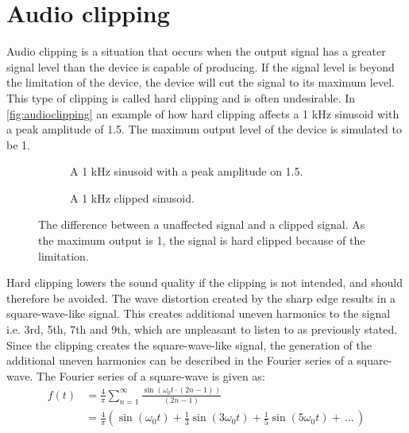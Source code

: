 \section{Audio clipping}

Audio clipping is a situation that occurs when the output signal has a greater signal level than the device is capable of producing. If the signal level is beyond the limitation of the device, the device will cut the signal to its maximum level. This type of clipping is called hard clipping and is often undesirable. In \autoref{fig:audioclipping} an example of how hard clipping affects a 1 kHz sinusoid with a peak amplitude of 1.5. The maximum output level of the device is simulated to be 1.

\begin{figure}[H]
\centering
\begin{subfigure}[t]{0.47\textwidth}
	
	\caption{A 1 kHz sinusoid with a peak amplitude on 1.5.}
	\label{fig:clippingClean}
\end{subfigure}
\hspace{6mm} 
\begin{subfigure}[t]{0.47\textwidth}
	
	\caption{A 1 kHz clipped sinusoid.}
	\label{fig:clippingDist}
\end{subfigure}
\caption{The difference between a unaffected signal and a clipped signal. As the maximum output is 1, the signal is hard clipped because of the limitation.}
\label{fig:audioclipping}
\end{figure}

Hard clipping lowers the sound quality if the clipping is not intended, and should therefore be avoided. The wave distortion created by the sharp edge results in a square-wave-like signal. This creates additional uneven harmonics to the signal i.e. 3rd, 5th, 7th and 9th, which are unpleasant to listen to as previously stated. Since the clipping creates the square-wave-like signal, the generation of the additional uneven harmonics can be described in the Fourier series of a square-wave. The Fourier series of a square-wave is given as:
\begin{align}\label{eq:fourier_series_square}
f(t) &= \frac{4}{\pi} \sum_{n=1}^{\infty} \frac{\sin (\omega_0 t \cdot (2n-1))}{(2n-1)} \\
	 &= \frac{4}{\pi} (\sin(\omega_0 t) + \frac{1}{3}\sin(3 \omega_0 t) + \frac{1}{5}\sin(5 \omega_0 t) + \, ... \,)
\end{align}
\begin{where}
\\
\end{where}

